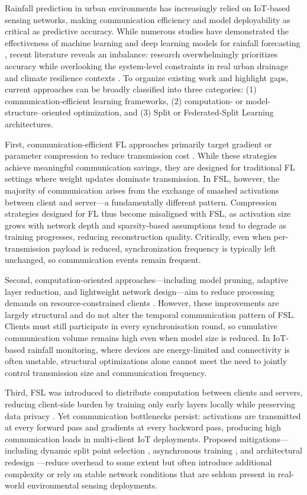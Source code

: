 \documentclass[conference]{IEEEtran}
\begin{document}
Rainfall prediction in urban environments has increasingly relied on IoT-based sensing networks, making communication efficiency and model deployability as critical as predictive accuracy. While numerous studies have demonstrated the effectiveness of machine learning and deep learning models for rainfall forecasting \cite{10.3389/frwa.2024.1378598}, recent literature reveals an imbalance: research overwhelmingly prioritizes accuracy while overlooking the system-level constraints in real urban drainage and climate resilience contexts \cite{CHAN2023100375}. To organize existing work and highlight gaps, current approaches can be broadly classified into three categories: (1) communication-efficient learning frameworks, (2) computation- or model-structure–oriented optimization, and (3) Split or Federated-Split Learning architectures. 

First, communication-efficient FL approaches primarily target gradient or parameter compression to reduce transmission cost \cite{10078005,2024ITWC...23.7362C}. While these strategies achieve meaningful communication savings, they are designed for traditional FL settings where weight updates dominate transmission. In FSL, however, the majority of communication arises from the exchange of smashed activations between client and server—a fundamentally different pattern. Compression strategies designed for FL thus become misaligned with FSL, as activation size grows with network depth and sparsity-based assumptions tend to degrade as training progresses, reducing reconstruction quality. Critically, even when per-transmission payload is reduced, synchronization frequency is typically left unchanged, so communication events remain frequent. 

Second, computation-oriented approaches—including model pruning, adaptive layer reduction, and lightweight network design—aim to reduce processing demands on resource-constrained clients \cite{10050151,10.3389/frwa.2024.1378598}. However, these improvements are largely structural and do not alter the temporal communication pattern of FSL. Clients must still participate in every synchronisation round, so cumulative communication volume remains high even when model size is reduced. In IoT-based rainfall monitoring, where devices are energy-limited and connectivity is often unstable, structural optimizations alone cannot meet the need to jointly control transmission size and communication frequency. 

Third, FSL was introduced to distribute computation between clients and servers, reducing client-side burden by training only early layers locally while preserving data privacy \cite{2023arXiv230205599M}. Yet communication bottlenecks persist: activations are transmitted at every forward pass and gradients at every backward pass, producing high communication loads in multi-client IoT deployments. Proposed mitigations—including dynamic split point selection \cite{2023arXiv230205599M}, asynchronous training \cite{2021arXiv210709786C}, and architectural redesign \cite{2026ITWC...25.1981L,10522472,10478872}—reduce overhead to some extent but often introduce additional complexity or rely on stable network conditions that are seldom present in real-world environmental sensing deployments. 
\end{document}
